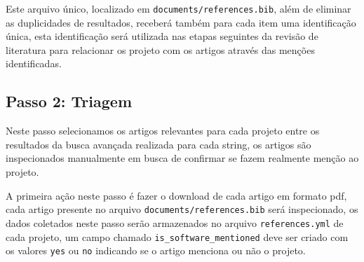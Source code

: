 %

Este arquivo único, localizado em \texttt{documents/references.bib},
além de eliminar as duplicidades de resultados, receberá também para
cada item uma identificação única, esta identificação será utilizada nas etapas
seguintes da revisão de literatura para relacionar os projeto com os
artigos através das menções identificadas.





\subsection{Passo 2: Triagem}


Neste passo selecionamos os artigos relevantes para cada projeto entre os
resultados da busca avançada realizada para cada string, os artigos são
inspecionados manualmente em busca de confirmar se fazem realmente menção ao
projeto.

A primeira ação neste passo é fazer o download de cada artigo em formato pdf,
cada artigo presente no arquivo \texttt{documents/references.bib} será
inspecionado, os dados coletados neste passo serão armazenados no arquivo
\texttt{references.yml} de cada projeto, um campo chamado
\texttt{is\_software\_mentioned} deve ser criado com os valores \texttt{yes} ou
\texttt{no} indicando se o artigo menciona ou não o projeto.

